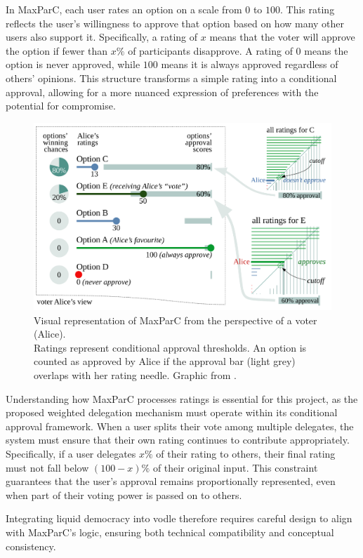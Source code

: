 In MaxParC, each user rates an option on a scale from $0$ to $100$. This rating reflects the user's willingness to approve that option based on how many other users also support it. Specifically, a rating of $x$ means that the voter will approve the option if fewer than $x\%$ of participants disapprove. A rating of $0$ means the option is never approved, while $100$ means it is always approved regardless of others' opinions. This structure transforms a simple rating into a conditional approval, allowing for a more nuanced expression of preferences with the potential for compromise.

\begin{figure}[H]
  \centering
  \includegraphics[width=0.8\linewidth]{../common/maxparc.png}
  \caption{Visual representation of MaxParC from the perspective of a voter (Alice). \\ Ratings represent conditional approval thresholds. An option is counted as approved by Alice if the approval bar (light grey) overlaps with her rating needle. Graphic from \citet{heitzig_fair_2024}.}
\end{figure}

Understanding how MaxParC processes ratings is essential for this project, as the proposed weighted delegation mechanism must operate within its conditional approval framework. When a user splits their vote among multiple delegates, the system must ensure that their own rating continues to contribute appropriately. Specifically, if a user delegates $x\%$ of their rating to others, their final rating must not fall below $(100-x)\%$ of their original input. This constraint guarantees that the user's approval remains proportionally represented, even when part of their voting power is passed on to others.

Integrating liquid democracy into vodle therefore requires careful design to align with MaxParC's logic, ensuring both technical compatibility and conceptual consistency.

